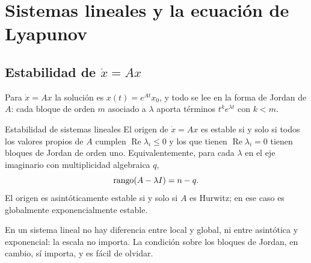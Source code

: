 \section{Sistemas lineales y la ecuación de Lyapunov}
\label{sec:ly-lineales}

\subsection{Estabilidad de $\dot x=Ax$}

Para $\dot x=Ax$ la solución es $x(t)=e^{At}x_0$, y todo se lee en la forma de Jordan de $A$: cada bloque de orden $m$ asociado a $\lambda$ aporta términos $t^ke^{\lambda t}$ con $k<m$.

\begin{teorema}[label=thm:ly-lineal]{Estabilidad de sistemas lineales \citep[Teo.~4.5]{Kha02}}
El origen de $\dot x=Ax$ es estable si y solo si todos los valores propios de $A$ cumplen $\operatorname{Re}\lambda_i\le0$ y los que tienen $\operatorname{Re}\lambda_i=0$ tienen bloques de Jordan de orden uno. Equivalentemente, para cada $\lambda$ en el eje imaginario con multiplicidad algebraica $q$,
\begin{equation}
  \operatorname{rango}(A-\lambda I)=n-q .
  \label{eq:ly-rango}
\end{equation}
El origen es asintóticamente estable si y solo si $A$ es Hurwitz; en ese caso es globalmente exponencialmente estable.
\end{teorema}

En un sistema lineal no hay diferencia entre local y global, ni entre asintótica y exponencial: la escala no importa. La condición sobre los bloques de Jordan, en cambio, sí importa, y es fácil de olvidar.

